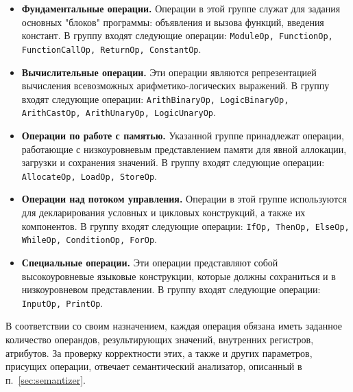 \begin{itemize}
    \item \textbf{Фундаментальные операции.}
          Операции в этой группе служат для задания основных "блоков" программы: объявления и вызова функций, введения констант.
          В группу входят следующие операции:
          \verb|ModuleOp, FunctionOp, FunctionCallOp, ReturnOp, ConstantOp|.
    \item \textbf{Вычислительные операции.}
          Эти операции являются репрезентацией вычисления всевозможных арифметико-логических выражений.
          В группу входят следующие операции:
          \verb|ArithBinaryOp, LogicBinaryOp, ArithCastOp, ArithUnaryOp, LogicUnaryOp|.
    \item \textbf{Операции по работе с памятью.}
          Указанной группе принадлежат операции, работающие с низкоуровневым представлением памяти для явной аллокации, загрузки и сохранения значений.
          В группу входят следующие операции:
          \verb|AllocateOp, LoadOp, StoreOp|.
    \item \textbf{Операции над потоком управления.}
          Операции в этой группе используются для декларирования условных и цикловых конструкций, а также их компонентов.
          В группу входят следующие операции:
          \verb|IfOp, ThenOp, ElseOp, WhileOp, ConditionOp, ForOp|.
    \item \textbf{Специальные операции.}
          Эти операции представляют собой высокоуровневые языковые конструкции, которые должны сохраниться и в низкоуровневом представлении.
          В группу входят следующие операции:
          \verb|InputOp, PrintOp|.
\end{itemize}

В соответствии со своим назначением, каждая операция обязана иметь заданное количество операндов, результирующих значений, внутренних регистров, атрибутов.
За проверку корректности этих, а также и других параметров, присущих операции, отвечает семантический анализатор, описанный в п.~\ref{sec:semantizer}.
